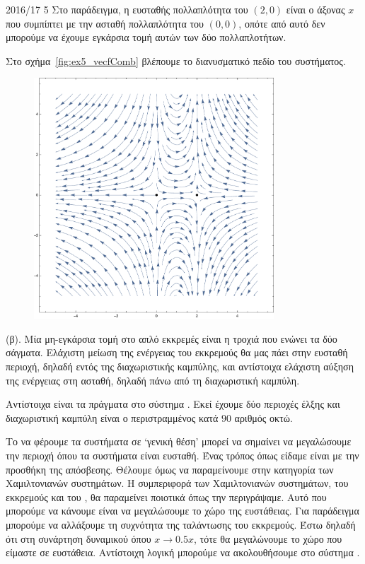 \begin{solution}{2016/17 5}
    Στο παράδειγμα, η ευσταθής πολλαπλότητα του \( (2, 0) \) είναι ο άξονας
    \( x \) που συμπίπτει με την ασταθή πολλαπλότητα του \( (0, 0) \), οπότε από
    αυτό δεν μπορούμε να έχουμε εγκάρσια τομή αυτών των δύο πολλαπλοτήτων.

    Στο σχήμα~\eqref{fig:ex5_vecfComb} βλέπουμε το διανυσματικό πεδίο του
    συστήματος.
    \begin{figure}[h!]
        \centering
        \includegraphics[width=0.8\textwidth]{figures/ex5_vecfComb.pdf}
        \caption{}
        \label{fig:ex5_vecfComb}
    \end{figure}

    (β). Μία μη-εγκάρσια τομή στο απλό εκκρεμές είναι η τροχιά που ενώνει τα δύο
    σάγματα. Ελάχιστη μείωση της ενέργειας του εκκρεμούς θα μας πάει στην
    ευσταθή περιοχή, δηλαδή εντός της διαχωριστικής καμπύλης, και αντίστοιχα ελάχιστη
    αύξηση της ενέργειας στη ασταθή, δηλαδή πάνω από τη διαχωριστική καμπύλη.

    Αντίστοιχα είναι τα πράγματα στο σύστημα . Εκεί έχουμε δύο
    περιοχές έλξης και διαχωριστική καμπύλη είναι ο περιστραμμένος κατά
    \( 90 \) αριθμός οκτώ.

    Το να φέρουμε τα συστήματα σε \enquote*{γενική θέση} μπορεί να σημαίνει να
    μεγαλώσουμε την περιοχή όπου τα συστήματα είναι ευσταθή. Ένας τρόπος όπως
    είδαμε είναι με την προσθήκη της απόσβεσης. Θέλουμε όμως να
    παραμείνουμε στην κατηγορία των Χαμιλτονιανών συστημάτων. Η συμπεριφορά των
    Χαμιλτονιανών συστημάτων, του εκκρεμούς και του , θα παραμείνει
    ποιοτικά όπως την περιγράψαμε. Αυτό που μπορούμε να κάνουμε είναι να
    μεγαλώσουμε το χώρο της ευστάθειας. Για παράδειγμα μπορούμε να αλλάξουμε τη συχνότητα
    της ταλάντωσης του εκκρεμούς. Έστω δηλαδή ότι στη συνάρτηση δυναμικού
    όπου \( x \to 0.5x \), τότε θα μεγαλώνουμε το χώρο που είμαστε σε ευστάθεια.
    Αντίστοιχη λογική μπορούμε να ακολουθήσουμε στο σύστημα .
\end{solution}
